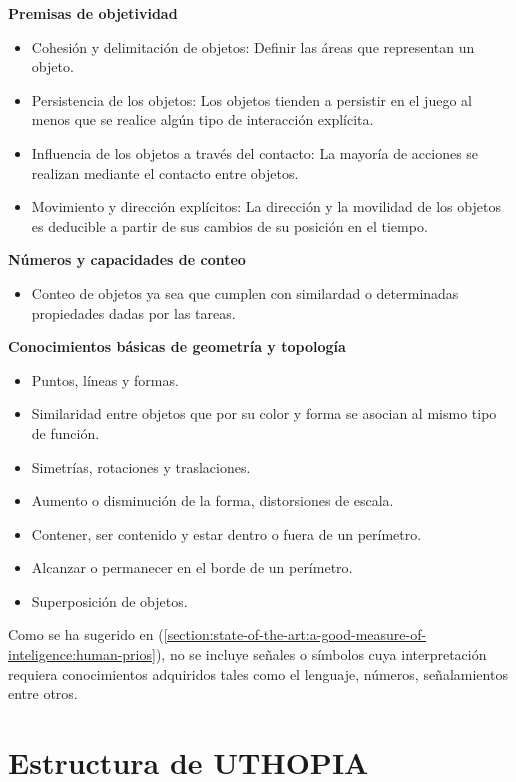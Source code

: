 \textbf{Premisas de objetividad}
\begin{itemize}
\item Cohesión y delimitación de objetos: Definir las áreas que representan un objeto.
\item Persistencia de los objetos: Los objetos tienden a persistir en el juego al menos que se realice algún tipo de interacción explícita.
\item Influencia de los objetos a través del contacto: La mayoría de acciones se realizan mediante el contacto entre objetos.
\item Movimiento y dirección explícitos: La dirección y la movilidad de los objetos es deducible a partir de sus cambios de su posición en el tiempo.
\end{itemize}

\textbf{Números y capacidades de conteo}
\begin{itemize}
    \item Conteo de objetos ya sea que cumplen con similardad o determinadas propiedades dadas por las tareas.
\end{itemize}

\textbf{Conocimientos básicas de geometría y topología}
\begin{itemize}
\item Puntos, líneas y formas.
\item Similaridad entre objetos que por su color y forma se asocian al mismo tipo de función.
\item Simetrías, rotaciones y traslaciones.
\item Aumento o disminución de la forma, distorsiones de escala.
\item Contener, ser contenido y estar dentro o fuera de un perímetro.
\item Alcanzar o permanecer en el borde de un perímetro.
\item Superposición de objetos.
\end{itemize}

Como se ha sugerido en (\ref{section:state-of-the-art:a-good-measure-of-inteligence:human-prios}), no se incluye señales o símbolos cuya interpretación requiera conocimientos adquiridos tales como el lenguaje, números, señalamientos entre otros. 

\section{Estructura de UTHOPIA}

